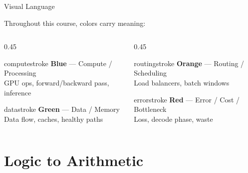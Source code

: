 \documentclass[aspectratio=169, 12pt]{beamer}
\begin{document}
\begin{frame}{Visual Language}

\small
Throughout this course, colors carry meaning:

\vspace{0.3cm}
\begin{columns}[T]
  \begin{column}{0.45\textwidth}
    \begin{mlsyscard}{computestroke}
    \textbf{Blue} --- Compute / Processing\\
    {\footnotesize GPU ops, forward/backward pass, inference}
    \end{mlsyscard}
    \vspace{0.15cm}
    \begin{mlsyscard}{datastroke}
    \textbf{Green} --- Data / Memory\\
    {\footnotesize Data flow, caches, healthy paths}
    \end{mlsyscard}
  \end{column}
  \begin{column}{0.45\textwidth}
    \begin{mlsyscard}{routingstroke}
    \textbf{Orange} --- Routing / Scheduling\\
    {\footnotesize Load balancers, batch windows}
    \end{mlsyscard}
    \vspace{0.15cm}
    \begin{mlsyscard}{errorstroke}
    \textbf{Red} --- Error / Cost / Bottleneck\\
    {\footnotesize Loss, decode phase, waste}
    \end{mlsyscard}
  \end{column}
\end{columns}
\end{frame}


\section{Logic to Arithmetic}
\end{document}
